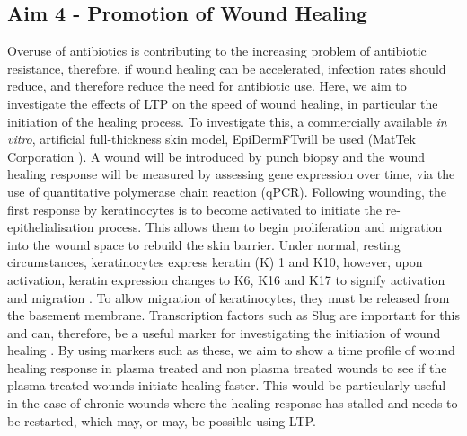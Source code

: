\documentclass[11pt, oneside]{article}   	%
\begin{document}



\subsection*{Aim 4 - Promotion of Wound Healing}
Overuse of antibiotics is contributing to the increasing problem of antibiotic resistance, therefore, if wound healing can be accelerated, infection rates should reduce, and therefore reduce the need for antibiotic use.
Here, we aim to investigate the effects of LTP on the speed of wound healing, in particular the initiation of the healing process.
To investigate this, a commercially available \textit{in vitro}, artificial full-thickness skin model, EpiDermFT\texttrademark will be used (MatTek Corporation \cite{MattekWebsite}). 
A wound will be introduced by punch biopsy and the wound healing response will be measured by assessing gene expression over time, via the use of quantitative polymerase chain reaction (qPCR).
Following wounding, the first response by keratinocytes is to become activated to initiate the re-epithelialisation process. This allows them to begin proliferation and migration into the wound space to rebuild the skin barrier.
Under normal, resting circumstances, keratinocytes express keratin (K) 1 and K10, however, upon activation, keratin expression changes to K6, K16 and K17 to signify activation and migration \cite{Pastar2014epithelialization}. 
To allow migration of keratinocytes, they must be released from the basement membrane.
Transcription factors such as Slug are important for this and can, therefore, be a useful marker for investigating the initiation of wound healing \cite{Savagner2005}.
By using markers such as these, we aim to show a time profile of wound healing response in plasma treated and non plasma treated wounds to see if the plasma treated wounds initiate healing faster.
This would be particularly useful in the case of chronic wounds where the healing response has stalled and needs to be restarted, which may, or may, be possible using LTP.
\end{document}
